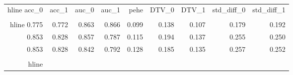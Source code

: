 \begin{table}[h]
\centering
\caption{}
\label{wd_para_0.0_wd_24.866914749145508}
\begin{tabular}{rrrrrrrrr}
\\hline
 acc\_0 &  acc\_1 &  auc\_0 &  auc\_1 &  pehe &  DTV\_0 &  DTV\_1 &  std\_diff\_0 &  std\_diff\_1 \\
\\hline
 0.775 &  0.772 &  0.863 &  0.866 & 0.099 &  0.138 &  0.107 &       0.179 &       0.192 \\
 0.853 &  0.828 &  0.857 &  0.787 & 0.115 &  0.194 &  0.137 &       0.255 &       0.250 \\
 0.853 &  0.828 &  0.842 &  0.792 & 0.128 &  0.185 &  0.135 &       0.257 &       0.252 \\
\\hline
\end{tabular}
\end{table}
